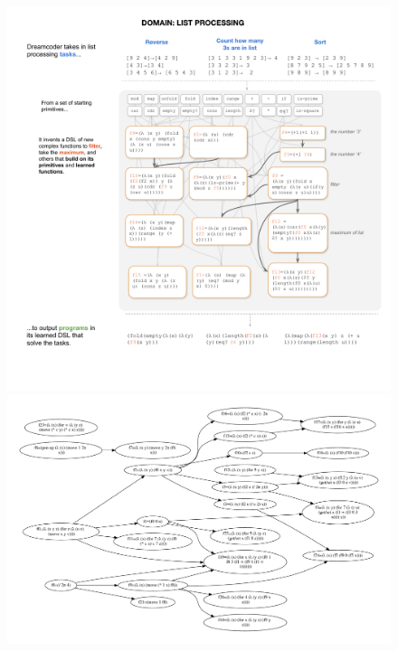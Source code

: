 \documentclass{article}
\begin{document}
\begin{figure}
  \includegraphics[width = \textwidth]{figures/dpl/list}
  \includegraphics[width = \textwidth]{figures/dpl/logo}
  \caption{}\label{exampleDSL}
\end{figure}






\end{document}

